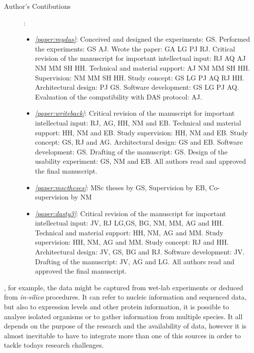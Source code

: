 \begin{description}
	\item[Author's Contibutions]:\\
		\begin{itemize}
			\item \emph{\ref{paper:mydas}}: Conceived and designed the experiments: GS. Performed the experiments: GS AJ. Wrote the paper: GA LG PJ RJ. Critical revision of the manuscript for important intellectual input: RJ AQ AJ NM MM SH HH. Technical and material support: AJ NM MM SH HH. Supervision: NM MM SH HH. Study concept: GS LG PJ AQ RJ HH. Architectural design: PJ GS. Software development: GS LG PJ AQ. Evaluation of the compatibility with DAS protocol: AJ.
			\item \emph{\ref{paper:writeback}}: Critical revision of the manuscript for important intellectual input: RJ, AG, HH, NM and EB. Technical and material support: HH, NM and EB. Study supervision: HH, NM and EB. Study concept: GS, RJ and AG. Architectural design: GS and EB. Software development: GS. Drafting of the manuscript: GS. Design of the usability experiment: GS, NM and EB. All authors read and approved the final manuscript.
			\item \emph{\ref{paper:msctheses}}: MSc theses by GS, Supervision by EB, Co-supervision by NM
			\item \emph{\ref{paper:dasty3}}: Critical revision of the manuscript for important intellectual input: JV, RJ LG,GS, BG, NM, MM, AG and HH. Technical and material support: HH, NM, AG and MM. Study supervision: HH, NM, AG and MM. Study concept:  RJ and HH. Architectural design: JV, GS, BG and RJ. Software development: JV. Drafting of the manuscript: JV, AG and LG. All authors read and approved the final manuscript.
		\end{itemize}
\end{description}
\newpage


, for example, the data might be captured from wet-lab experiments or deduced from \emph{in-silico} procedures. It can refer to nucleic information and sequenced data, but also to expression levels and other protein information, it is possible to analyse isolated organisms or to gather information from multiple species. It all depends on the purpose of the research and the availability of data, however it is almost inevitable to have to integrate more than one of this sources in order to tackle todays research challenges.

